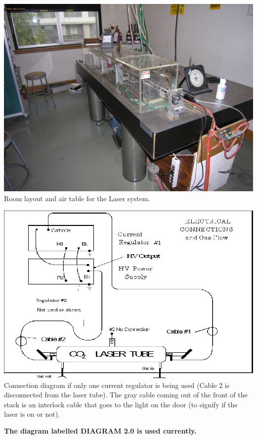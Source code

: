 \documentclass{../lab}
\begin{document}
\begin{center}
    \href{http://experimentationlab.berkeley.edu/sites/default/files/images/Co2_3.jpg}{\includegraphics[width=0.8\linewidth]{images/Co2_3.jpg}} \\
    Room layout and air table for the Laser system.
\end{center}

\begin{center}
    \href{http://experimentationlab.berkeley.edu/sites/default/files/images/Co2-29-new.png}{\includegraphics[width=0.6\linewidth]{images/Co2-29-new.png}} \\
    Connection diagram if only one current regulator is being used (Cable 2 is disconnected from the laser tube). The gray cable coming out of the front of the stack is an interlock cable that goes to the light on the door (to signify if the laser is on or not).
\end{center}

\textbf{The diagram labelled DIAGRAM 2.0 is used currently.}
\end{document}
